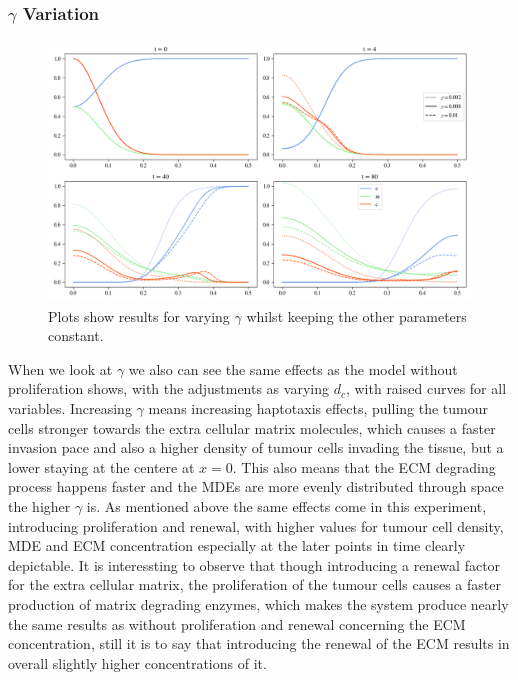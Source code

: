 \subsubsection*{$\gamma$ Variation}

\begin{figure}[h]
    \centering
    \includegraphics[width=\textwidth]{resources/images/prolif_gamma_variation.png}
    \caption{Plots show results for varying $\gamma$ whilst keeping the other parameters constant.}
    \label{fig:prolif_gamma_variation}
\end{figure}

When we look at $\gamma$ we also can see the same effects as the model without proliferation shows, with the adjustments as varying $d_c$, with raised curves for all variables. Increasing $\gamma$ means increasing haptotaxis effects, pulling the tumour cells stronger towards the extra cellular matrix molecules, which causes a faster invasion pace and also a higher density of tumour cells invading the tissue, but a lower staying at the centere at $x=0$. This also means that the ECM degrading process happens faster and the MDEs are more evenly distributed through space the higher $\gamma$ is. As mentioned above the same effects come in this experiment, introducing proliferation and renewal, with higher values for tumour cell density, MDE and ECM concentration especially at the later points in time clearly depictable. It is interessting to observe that though introducing a renewal factor for the extra cellular matrix, the proliferation of the tumour cells causes a faster production of matrix degrading enzymes, which makes the system produce nearly the same results as without proliferation and renewal concerning the ECM concentration, still  it is to say that introducing the renewal of the ECM results in overall slightly higher concentrations of it.

